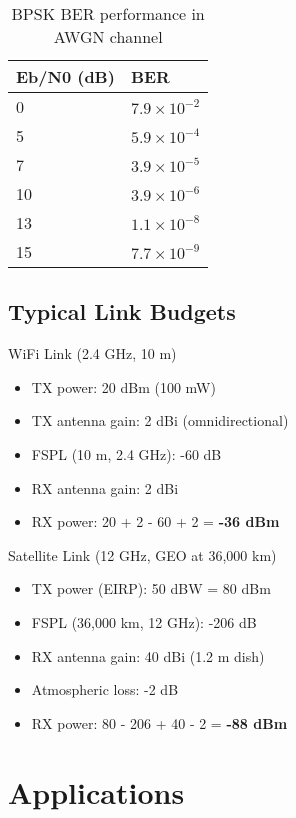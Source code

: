\begin{table}[h]
\centering
\begin{tabular}{@{}ll@{}}
\toprule
\textbf{Eb/N0 (dB)} & \textbf{BER} \\
\midrule
0 & $7.9 \times 10^{-2}$ \\
5 & $5.9 \times 10^{-4}$ \\
7 & $3.9 \times 10^{-5}$ \\
10 & $3.9 \times 10^{-6}$ \\
13 & $1.1 \times 10^{-8}$ \\
15 & $7.7 \times 10^{-9}$ \\
\bottomrule
\end{tabular}
\caption{BPSK BER performance in AWGN channel}
\label{tab:ber-bpsk}
\end{table}

\subsection{Typical Link Budgets}
\label{subsec:typical-link-budgets}

\begin{calloutbox}{WiFi Link (2.4 GHz, 10 m)}
\begin{itemize}
\item TX power: 20 dBm (100 mW)
\item TX antenna gain: 2 dBi (omnidirectional)
\item FSPL (10 m, 2.4 GHz): -60 dB
\item RX antenna gain: 2 dBi
\item RX power: 20 + 2 - 60 + 2 = \textbf{-36 dBm}
\end{itemize}
\end{calloutbox}

\begin{calloutbox}{Satellite Link (12 GHz, GEO at 36,000 km)}
\begin{itemize}
\item TX power (EIRP): 50 dBW = 80 dBm
\item FSPL (36,000 km, 12 GHz): -206 dB
\item RX antenna gain: 40 dBi (1.2 m dish)
\item Atmospheric loss: -2 dB
\item RX power: 80 - 206 + 40 - 2 = \textbf{-88 dBm}
\end{itemize}
\end{calloutbox}

\section{Applications}
\label{sec:applications}

